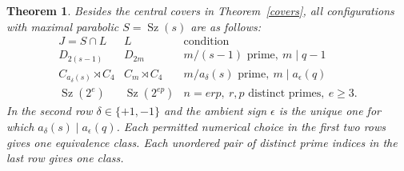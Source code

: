\documentclass[11pt,a4paper]{article}
\newtheorem{theorem}{Theorem}
\newcommand{\Sz}{\operatorname{Sz}}
\begin{document}
\begin{theorem}\label{list}
Besides the central covers in Theorem~\ref{covers}, all configurations
with maximal parabolic $S=\Sz(s)$ are as follows:
\[
\begin{array}{c|c|c}
 J=S\cap L&L&\text{condition}\\\hline
 D_{2(s-1)}&D_{2m}&m/(s-1)\text{ prime},\ m\mid q-1\\
 C_{a_\delta(s)}\rtimes C_4&C_m\rtimes C_4&
 m/a_\delta(s)\text{ prime},\ m\mid a_\epsilon(q)\\
 \Sz(2^e)&\Sz(2^{ep})&
 n=erp,\ r,p\text{ distinct primes},\ e\ge3.
\end{array}                                               \tag{4}
\]
In the second row $\delta\in\{+1,-1\}$ and the ambient sign
$\epsilon$ is the unique one for which
$a_\delta(s)\mid a_\epsilon(q)$. Each permitted numerical choice
in the first two rows gives one equivalence class. Each unordered
pair of distinct prime indices in the last row gives one class.
\end{theorem}
\end{document}
